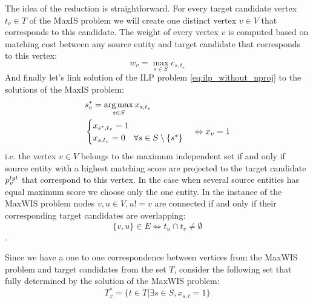 The idea of the reduction is straightforward. For every target candidate vertex \( t_v \in T \) of the MaxIS problem
we will create one distinct vertex \( v \in V \) that corresponds to this candidate.
The weight of every vertex \( v \) is computed based on matching cost between any source entity and
target candidate that corresponds to this vertex:
\[
  w_v = \max\limits_{s \in S} c_{s, t_v}
\]
And finally let's link solution of the ILP problem \eqref{eq:ilp_without_nproj}
to the solutions of the MaxIS problem:
\begin{equation} \label{eq:link_variables}
  \begin{aligned}
    &s^*_v = \operatorname*{arg\,max}\limits_{s \in S} x_{s, t_v} \\
    &
    \begin{cases}
      x_{s^*, t_v} = 1 \\
      x_{s, t_v} = 0 \quad \forall s \in S \setminus \{ s^* \} \\
    \end{cases}
    \Leftrightarrow x_v = 1
  \end{aligned}
\end{equation}
i.e. the vertex \( v \in V \) belongs to the maximum independent set if and only if source entity with
a highest matching score are projected to the target candidate \( p_v^{tgt} \) that correspond to this vertex. In the case
when several source entities has equal maximum score we choose only the one entity.
In the instance of the MaxWIS problem nodes \( v, u \in V, u != v \) are connected if and only
if their corresponding target candidates are overlapping:
\[
  \{ v, u \} \in E \Leftrightarrow t_u \cap t_v \neq \emptyset
\].

Since we have a one to one correspondence between vertices from the MaxWIS problem and target
candidates from the set \( T \), consider the following set that fully determined by the solution of the
MaxWIS problem:
\[
  T^*_{x} = \{ t \in T | \exists s \in S, x_{s, t} = 1 \}
\]


